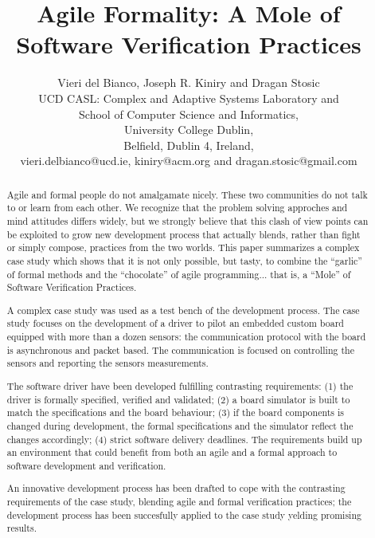 \documentclass{article} \usepackage{times}
\begin{document}
\title{Agile Formality: A Mole of Software Verification Practices}

\author{Vieri del Bianco, Joseph R. Kiniry and Dragan Stosic\\
  UCD CASL: Complex and Adaptive Systems Laboratory and\\
  School of Computer Science and Informatics,\\
  University College Dublin,\\
  Belfield, Dublin 4, Ireland,\\
  vieri.delbianco@ucd.ie, kiniry@acm.org and dragan.stosic@gmail.com\\
}

\maketitle

\begin{abstract}

Agile and formal people do not amalgamate nicely. These two communities do not talk to or learn from each other. We recognize that the problem solving approches and mind attitudes differs widely, but we strongly believe that this clash of view points can be exploited to grow new development process that actually blends, rather than fight or simply compose, practices from the two worlds. This paper summarizes a complex case study which shows that it is not only possible, but tasty, to combine the ``garlic'' of formal methods and the ``chocolate'' of agile programming... that is, a ``Mole'' of Software Verification Practices.

A complex case study was used as a test bench of the development process. The case study focuses on the development of a driver to pilot an embedded custom board equipped with more than a dozen sensors: the communication protocol with the board is asynchronous and packet based. The communication is focused on controlling the sensors and reporting the sensors measurements.

The software driver have been developed fulfilling contrasting requirements: (1) the driver is formally specified, verified and validated; (2) a board simulator is built to match the specifications and the board behaviour; (3) if the board components is changed during development, the formal specifications and the simulator reflect the changes accordingly; (4) strict software delivery deadlines. The requirements build up an environment that could benefit from both an agile and a formal approach to software development and verification.

An innovative development process has been drafted to cope with the contrasting requirements of the case study, blending agile and formal verification practices; the development process has been succesfully applied to the case study yelding promising results. 

\end{abstract}
\end{document}
